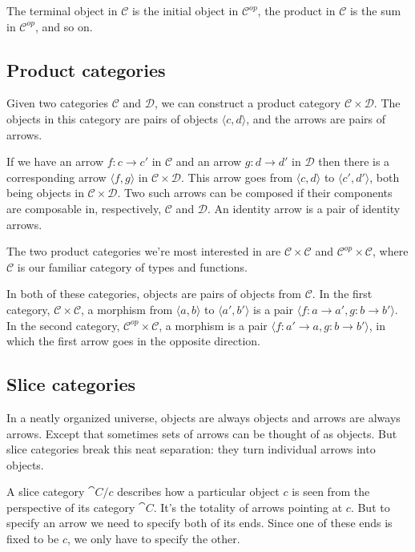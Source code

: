 \documentclass[DaoFP]{subfiles}
\begin{document}
The terminal object in  $\mathcal{C}$ is the initial object in $\mathcal{C}^{op}$, the product in  $\mathcal{C}$ is the sum in $\mathcal{C}^{op}$, and so on. 

\subsection{Product categories}

Given two categories $\mathcal{C}$ and $\mathcal{D}$, we can construct a product category $\mathcal{C} \times \mathcal{D}$. The objects in this category are pairs of objects $\langle c, d \rangle $, and the arrows are pairs of arrows. 

If we have an arrow $f \colon c \to c'$ in $\mathcal{C}$ and an arrow $g \colon d \to d'$ in $\mathcal{D}$ then there is a corresponding arrow $\langle f, g \rangle$ in $\mathcal{C} \times \mathcal{D}$.  This arrow goes from $\langle c, d \rangle $ to $\langle c', d' \rangle $, both being objects in $\mathcal{C} \times \mathcal{D}$. Two such arrows can be composed if their components are composable in, respectively, $\mathcal{C}$ and $\mathcal{D}$. An identity arrow is a pair of identity arrows.

The two product categories we're most interested in are $\mathcal{C} \times \mathcal{C}$ and $\mathcal{C}^{op} \times \mathcal{C}$, where $\mathcal{C}$ is our familiar category of types and functions.

In both of these categories, objects are pairs of objects from $\mathcal{C}$. In the first category, $\mathcal{C} \times \mathcal{C}$, a morphism from $\langle a, b \rangle $ to $\langle a', b' \rangle $ is a pair $\langle f \colon a \to a', g \colon b \to b' \rangle $. In the second category, $\mathcal{C}^{op} \times \mathcal{C}$, a morphism is a pair $\langle f \colon a' \to a, g \colon b \to b' \rangle $, in which the first arrow goes in the opposite direction.

\subsection{Slice categories}

In a neatly organized universe, objects are always objects and arrows are always arrows. Except that sometimes sets of arrows can be thought of as objects. But slice categories break this neat separation: they turn individual arrows into objects. 

A slice category $\cat C/c$ describes how a particular object $c$ is seen from the perspective of its category $\cat C$. It's the totality of arrows pointing at $c$. But to specify an arrow we need to specify both of its ends. Since one of these ends is fixed to be $c$, we only have to specify the other.
\end{document}
